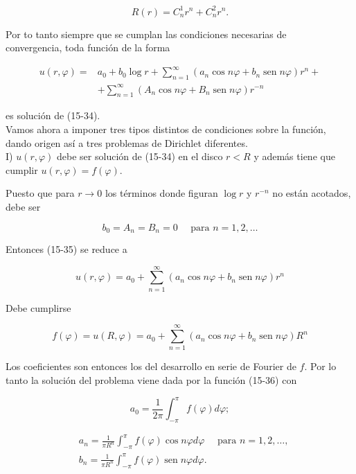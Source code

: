 \documentclass[10pt]{article}
\theoremstyle{plain}
\theoremstyle{definition}
\theoremstyle{remark}
\begin{document}
$$
R(r)=C_{n}^{1} r^{n}+C_{n}^{2} r^{n} .
$$

Por to tanto siempre que se cumplan las condiciones necesarias de\\
convergencia, toda función de la forma


\begin{align*}
u(r, \varphi)= & a_{0}+b_{0} \log r+\sum_{n=1}^{\infty}\left(a_{n} \cos n \varphi+b_{n} \operatorname{sen} n \varphi\right) r^{n}+ \\
& +\sum_{n=1}^{\infty}\left(A_{n} \cos n \varphi+B_{n} \operatorname{sen} n \varphi\right) r^{-n} \tag{15-35}
\end{align*}


es solución de (15-34).\\
Vamos ahora a imponer tres tipos distintos de condiciones sobre la función, dando origen así a tres problemas de Dirichlet diferentes.\\
I) $u(r, \varphi)$ debe ser solución de (15-34) en el disco $r<R$ y además tiene que cumplir $u(r, \varphi)=f(\varphi)$.

Puesto que para $r \rightarrow 0$ los términos donde figuran $\log r$ y $r^{-n}$ no están acotados, debe ser

$$
b_{0}=A_{n}=B_{n}=0 \quad \text { para } n=1,2, \ldots
$$

Entonces (15-35) se reduce a


\begin{equation*}
u(r, \varphi)=a_{0}+\sum_{n=1}^{\infty}\left(a_{n} \cos n \varphi+b_{n} \operatorname{sen} n \varphi\right) r^{n} \tag{15-36}
\end{equation*}


Debe cumplirse

$$
f(\varphi)=u(R, \varphi)=a_{0}+\sum_{n=1}^{\infty}\left(a_{n} \cos n \varphi+b_{n} \operatorname{sen} n \varphi\right) R^{n}
$$

Los coeficientes son entonces los del desarrollo en serie de Fourier de $f$. Por lo tanto la solución del problema viene dada por la función (15-36) con

$$
a_{0}=\frac{1}{2 \pi} \int_{-\pi}^{\pi} f(\varphi) d \varphi ;
$$


$$
\begin{aligned}
& a_{n}=\frac{1}{\pi R^{n}} \int_{-\pi}^{\pi} f(\varphi) \cos n \varphi d \varphi \quad \text { para } n=1,2, \ldots, \\
& b_{n}=\frac{1}{\pi R^{n}} \int_{-\pi}^{\pi} f(\varphi) \operatorname{sen} n \varphi d \varphi .
\end{aligned}
$$
\end{document}
